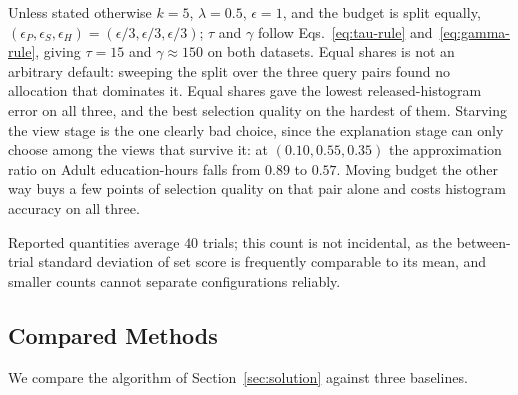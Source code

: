 Unless stated otherwise $k=5$, $\lambda=0.5$, $\epsilon=1$, and the budget is split equally, $(\epsilon_P,\epsilon_S,\epsilon_H)=(\epsilon/3,\epsilon/3,\epsilon/3)$; $\tau$ and $\gamma$ follow Eqs.~\eqref{eq:tau-rule} and~\eqref{eq:gamma-rule}, giving $\tau=15$ and $\gamma\approx150$ on both datasets.
Equal shares is not an arbitrary default: sweeping the split over the three query pairs found no allocation that dominates it.
Equal shares gave the lowest released-histogram error on all three, and the best selection quality on the hardest of them.
Starving the view stage is the one clearly bad choice, since the explanation stage can only choose among the views that survive it: at $(0.10,0.55,0.35)$ the approximation ratio on Adult education-hours falls from $0.89$ to $0.57$.
Moving budget the other way buys a few points of selection quality on that pair alone and costs histogram accuracy on all three.

Reported quantities average $40$ trials; this count is not incidental, as the between-trial standard deviation of set score is frequently comparable to its mean, and smaller counts cannot separate configurations reliably.

\subsection{Compared Methods}
\label{subsec:compared-methods}

We compare the algorithm of Section~\ref{sec:solution} against three baselines.

